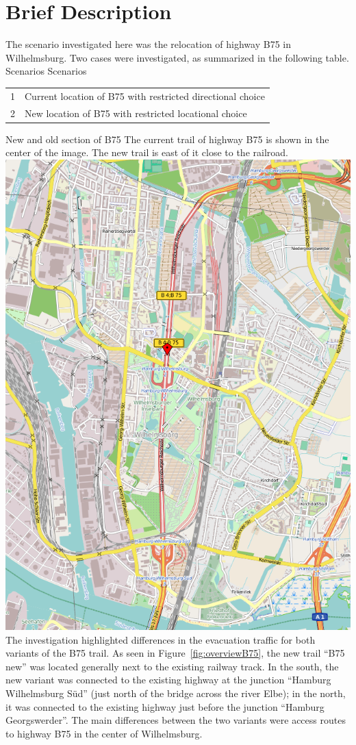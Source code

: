 \section{Brief Description}
The scenario investigated here was the relocation of highway B75 in Wilhelmsburg. Two cases were investigated, as summarized in the following table.
%
\createtable%
	{Scenarios}%
	{Scenarios}%
	{\label{table:b75scenarios}}%
	{%
	\begin{tabular}{|l | l|}
	\hline
	1 & Current location of B75 with restricted directional choice\\
	2 & New location of B75 with restricted locational choice\\
	\hline
\end{tabular}
}%
{}%
%
\createfigure%
	{New and old section of B75}%
	{The current trail of highway B75 is shown in the center of the image. The new trail is east of it close to the railroad.}%
	{\label{fig:overviewB75}}%
	{\includegraphics[width=0.7\linewidth]{using/figures/B75overview}}%
{}
%
The investigation highlighted differences in the evacuation traffic for both variants of the B75 trail. As seen in Figure~\ref{fig:overviewB75}, the new trail ``B75 new'' was located generally next to the existing railway track. In the south, the new variant was connected to the existing highway at the junction ``Hamburg Wilhelmsburg Süd'' (just north of the bridge across the river Elbe); in the north, it was connected to the existing highway just before the junction ``Hamburg Georgswerder''. The main differences between the two variants were access routes to highway B75 in the center of Wilhelmsburg.

